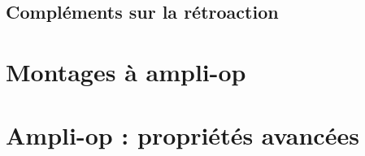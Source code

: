 \subsection{Compléments sur la rétroaction}




\section{Montages à ampli-op}
\section{Ampli-op : propriétés avancées}